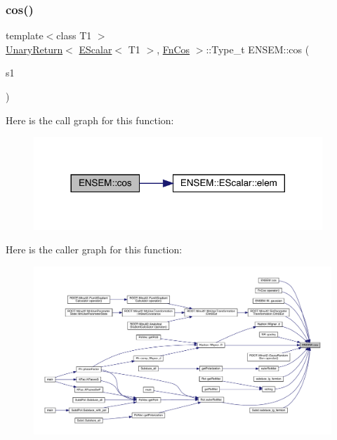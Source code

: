 \subsubsection{\texorpdfstring{cos()}{cos()}}
{\footnotesize\ttfamily template$<$class T1 $>$ \\
\mbox{\hyperlink{structENSEM_1_1UnaryReturn}{Unary\+Return}}$<$ \mbox{\hyperlink{classENSEM_1_1EScalar}{E\+Scalar}}$<$ T1 $>$, \mbox{\hyperlink{structENSEM_1_1FnCos}{Fn\+Cos}} $>$\+::Type\+\_\+t E\+N\+S\+E\+M\+::cos (\begin{DoxyParamCaption}\item[{const \mbox{\hyperlink{classENSEM_1_1EScalar}{E\+Scalar}}$<$ T1 $>$ \&}]{s1 }\end{DoxyParamCaption})\hspace{0.3cm}{\ttfamily [inline]}}

Here is the call graph for this function\+:
\nopagebreak
\begin{figure}[H]
\begin{center}
\leavevmode
\includegraphics[width=308pt]{d4/dca/group__escalar_ga841db2f3f6d6a553733b1b75a638f052_cgraph}
\end{center}
\end{figure}
Here is the caller graph for this function\+:
\nopagebreak
\begin{figure}[H]
\begin{center}
\leavevmode
\includegraphics[width=350pt]{d4/dca/group__escalar_ga841db2f3f6d6a553733b1b75a638f052_icgraph}
\end{center}
\end{figure}
\mbox{\label{group__escalar_ga4a9bfa7287ccf8fef9605aa9e9a44884}} 
